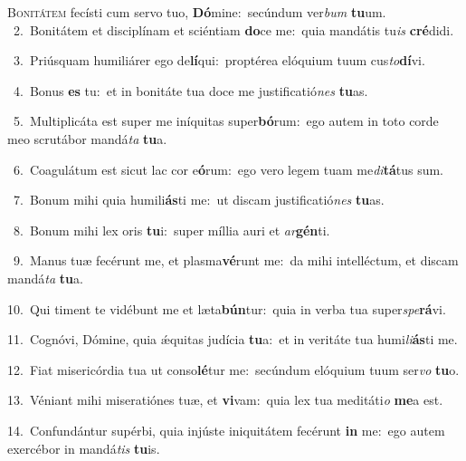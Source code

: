 \lettrine{\initial\textcolor{\initialcolor}{B}}{onitátem} fecísti cum servo tuo, \textbf{Dó}\-mine:~\star secúndum ver\textit{bum} \textbf{tu}\-um.\\
{\numbfont\textcolor{\numbcolor}{~2.}}~Bonitátem et disciplínam et sciéntiam \textbf{do}\-ce me:~\star quia mandátis tu\textit{is} \textbf{cré}\-didi.\par
{\numbfont\textcolor{\numbcolor}{~3.}}~Priúsquam humiliárer ego de\-\textbf{lí}\-qui:~\star proptérea elóquium tuum cus\-\textit{to}\-\textbf{dí}vi.\par
{\numbfont\textcolor{\numbcolor}{~4.}}~Bonus \textbf{es} tu:~\star et in bonitáte tua doce me justificatió\textit{nes} \textbf{tu}\-as.\par
{\numbfont\textcolor{\numbcolor}{~5.}}~Multiplicáta est super me iníquitas super\-\textbf{bó}\-rum:~\star ego autem in toto corde meo scrutábor mandá\textit{ta} \textbf{tu}\-a.\par
{\numbfont\textcolor{\numbcolor}{~6.}}~Coagulátum est sicut lac cor e\-\textbf{ó}\-rum:~\star ego vero legem tuam me\-\textit{di}\-\textbf{tá}tus sum.\par
{\numbfont\textcolor{\numbcolor}{~7.}}~Bonum mihi quia humili\-\textbf{ás}\-ti me:~\star ut discam justificatió\textit{nes} \textbf{tu}\-as.\par
{\numbfont\textcolor{\numbcolor}{~8.}}~Bonum mihi lex oris \textbf{tu}\-i:~\star super míllia auri et \textit{ar}\-\textbf{gén}ti.\par
{\numbfont\textcolor{\numbcolor}{~9.}}~Manus tuæ fecérunt me, et plasma\-\textbf{vé}\-runt me:~\star da mihi intelléctum, et discam mandá\textit{ta} \textbf{tu}\-a.\par
{\numbfont\textcolor{\numbcolor}{10.}}~Qui timent te vidébunt me et læta\-\textbf{bún}\-tur:~\star quia in verba tua super\-\textit{spe}\-\textbf{rá}vi.\par
{\numbfont\textcolor{\numbcolor}{11.}}~Cognóvi, Dómine, quia ǽquitas judícia \textbf{tu}\-a:~\star et in veritáte tua humi\-\textit{li}\-\textbf{ás}ti me.\par
{\numbfont\textcolor{\numbcolor}{12.}}~Fiat misericórdia tua ut conso\-\textbf{lé}\-tur me:~\star secúndum elóquium tuum ser\textit{vo} \textbf{tu}\-o.\par
{\numbfont\textcolor{\numbcolor}{13.}}~Véniant mihi miseratiónes tuæ, et \textbf{vi}\-vam:~\star quia lex tua meditáti\textit{o} \textbf{me}\-a est.\par
{\numbfont\textcolor{\numbcolor}{14.}}~Confundántur supérbi, quia injúste iniquitátem fecérunt \textbf{in} me:~\star ego autem exercébor in mandá\textit{tis} \textbf{tu}\-is.\par
